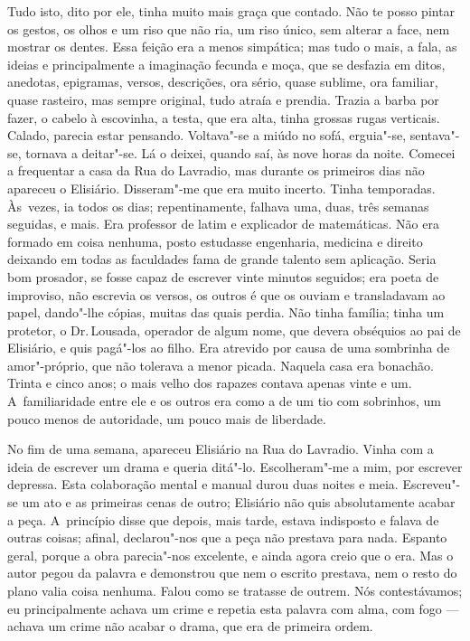 \begin{linenumbers}
Tudo isto, dito por ele, tinha muito mais graça que contado. Não te
posso pintar os gestos, os olhos e um riso que não ria, um riso único,
sem alterar a face, nem mostrar os dentes. Essa feição era a menos
simpática; mas tudo o mais, a fala, as ideias e principalmente a
imaginação fecunda e moça, que se desfazia em ditos, anedotas,
epigramas, versos, descrições, ora sério, quase sublime, ora familiar,
quase rasteiro, mas sempre original, tudo atraía e prendia. Trazia a
barba por fazer, o cabelo à escovinha, a testa, que era alta, tinha
grossas rugas verticais. Calado, parecia estar pensando. Voltava"-se a
miúdo no sofá, erguia"-se, sentava"-se, tornava a deitar"-se. Lá o deixei,
quando saí, às nove horas da noite. Comecei a frequentar a casa da Rua
do Lavradio, mas durante os primeiros dias não apareceu o Elisiário.
Disseram"-me que era muito incerto. Tinha temporadas. Às~vezes, ia todos
os dias; repentinamente, falhava uma, duas, três semanas seguidas, e
mais. Era professor de latim e explicador de matemáticas. Não era
formado em coisa nenhuma, posto estudasse engenharia, medicina e direito
deixando em todas as faculdades fama de grande talento sem aplicação.
Seria bom prosador, se fosse capaz de escrever vinte minutos seguidos;
era poeta de improviso, não escrevia os versos, os outros é que os
ouviam e transladavam ao papel, dando"-lhe cópias, muitas das quais
perdia. Não tinha família; tinha um protetor, o Dr.\,Lousada, operador de
algum nome, que devera obséquios ao pai de Elisiário, e quis pagá"-los ao
filho. Era atrevido por causa de uma sombrinha de amor"-próprio, que não
tolerava a menor picada. Naquela casa era bonachão. Trinta e cinco anos;
o mais velho dos rapazes contava apenas vinte e um. A~familiaridade
entre ele e os outros era como a de um tio com sobrinhos, um pouco menos
de autoridade, um pouco mais de liberdade.

No fim de uma semana, apareceu Elisiário na Rua do Lavradio. Vinha com a
ideia de escrever um drama e queria ditá"-lo. Escolheram"-me a mim, por
escrever depressa. Esta colaboração mental e manual durou duas noites e
meia. Escreveu"-se um ato e as primeiras cenas de outro; Elisiário não
quis absolutamente acabar a peça. A~princípio disse que depois, mais
tarde, estava indisposto e falava de outras coisas; afinal, declarou"-nos
que a peça não prestava para nada. Espanto geral, porque a obra
parecia"-nos excelente, e ainda agora creio que o era. Mas o autor pegou
da palavra e demonstrou que nem o escrito prestava, nem o resto do plano
valia coisa nenhuma. Falou como se tratasse de outrem. Nós
contestávamos; eu principalmente achava um crime e repetia esta palavra
com alma, com fogo --- achava um crime não acabar o drama, que era de
primeira ordem.


\end{linenumbers}
